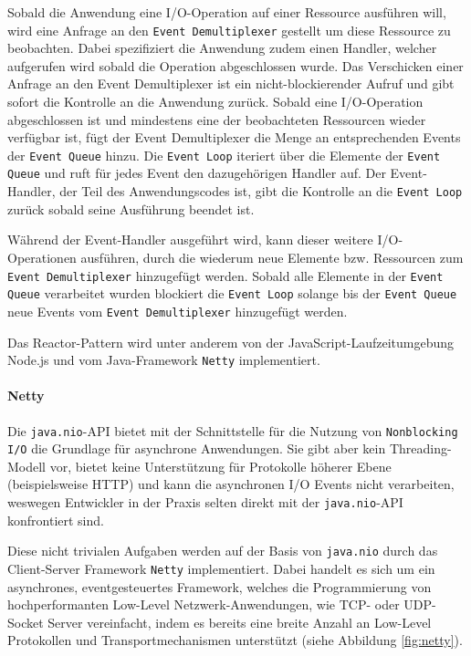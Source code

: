 Sobald die Anwendung eine I/O-Operation auf einer Ressource ausführen will, wird eine Anfrage an den
\verb|Event Demultiplexer| gestellt um diese Ressource zu beobachten.
Dabei spezifiziert die Anwendung zudem einen Handler, welcher aufgerufen wird sobald die Operation abgeschlossen wurde.
Das Verschicken einer Anfrage an den Event Demultiplexer ist ein nicht-blockierender Aufruf und gibt sofort die Kontrolle
an die Anwendung zurück.
Sobald eine I/O-Operation abgeschlossen ist und mindestens eine der beobachteten Ressourcen wieder verfügbar ist,
fügt der Event Demultiplexer die Menge an entsprechenden Events der \verb|Event Queue| hinzu.
Die \verb|Event Loop| iteriert über die Elemente der \verb|Event Queue| und ruft für jedes Event den dazugehörigen Handler auf.
Der Event-Handler, der Teil des Anwendungscodes ist, gibt die Kontrolle an die \verb|Event Loop| zurück sobald seine Ausführung
beendet ist.

Während der Event-Handler ausgeführt wird, kann dieser weitere I/O-Operationen ausführen, durch die wiederum
neue Elemente bzw. Ressourcen zum \verb|Event Demultiplexer| hinzugefügt werden.
Sobald alle Elemente in der \verb|Event Queue| verarbeitet wurden blockiert die \verb|Event Loop| solange
bis der \verb|Event Queue| neue Events vom \verb|Event Demultiplexer| hinzugefügt werden. \parencite{SchmidtReactorPattern}

Das Reactor-Pattern wird unter anderem von der JavaScript-Laufzeitumgebung Node.js und vom Java-Framework \verb|Netty| implementiert.

\paragraph{Netty}

Die \verb|java.nio|-API bietet mit der Schnittstelle für die Nutzung von \verb|Nonblocking I/O| die Grundlage für asynchrone Anwendungen.
Sie gibt aber kein Threading-Modell vor, bietet keine Unterstützung für Protokolle höherer Ebene (beispielsweise HTTP) und
kann die asynchronen I/O Events nicht verarbeiten, weswegen Entwickler in der Praxis selten direkt mit der \verb|java.nio|-API
konfrontiert sind.

Diese nicht trivialen Aufgaben werden auf der Basis von \verb|java.nio| durch das Client-Server Framework \verb|Netty| implementiert.
Dabei handelt es sich um ein asynchrones, eventgesteuertes Framework, welches
die Programmierung von hochperformanten Low-Level Netzwerk-Anwendungen, wie TCP- oder UDP-Socket Server vereinfacht, indem
es bereits eine breite Anzahl an Low-Level Protokollen und Transportmechanismen unterstützt (siehe Abbildung \ref{fig:netty}). \parencite{NettyUserAction}

